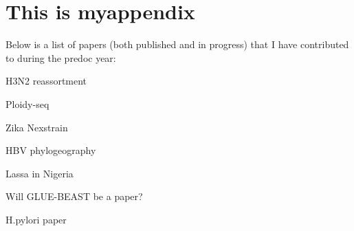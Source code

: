 \chapter{This is myappendix}\label{ch:myappendix}

Below is a list of papers (both published and in progress) that I have contributed to during the predoc year:

H3N2 reassortment

Ploidy-seq

Zika Nexstrain

HBV phylogeography

Lassa in Nigeria

Will GLUE-BEAST be a paper?

H.pylori paper


\cleardoublepage

